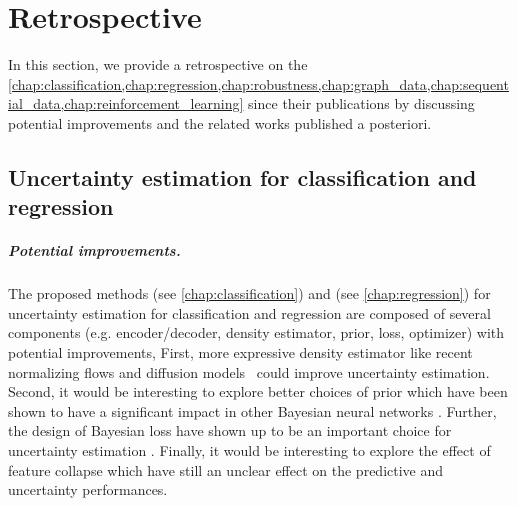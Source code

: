 \chapter{Retrospective}
\label{chap:retrospective}

In this section, we provide a retrospective on the \cref{chap:classification,chap:regression,chap:robustness,chap:graph_data,chap:sequential_data,chap:reinforcement_learning} since their publications by discussing potential improvements and the related works published a posteriori.

\section{Uncertainty estimation for classification and regression} 

\paragraph{Potential improvements.} The proposed methods \PostNetacro{} (see \cref{chap:classification}) and \NatPNacro{} (see \cref{chap:regression}) for uncertainty estimation for classification and regression are composed of several components (e.g. encoder/decoder, density estimator, prior, loss, optimizer) with potential improvements, First, more expressive density estimator like recent normalizing flows \cite{nf-review} and diffusion models \cite{variationaldiffussion2022kingma} could improve uncertainty estimation. Second, it would be interesting to explore better choices of prior which have been shown to have a significant impact in other Bayesian neural networks \cite{bayesposterior2020wenzel, coldaleatoric2020adlam}. Further, the design of Bayesian loss have shown up to be an important choice for uncertainty estimation \cite{bengs2022pitfalls}. Finally, it would be interesting to explore the effect of feature collapse \cite{due} which have still an unclear effect on the predictive and uncertainty performances.

